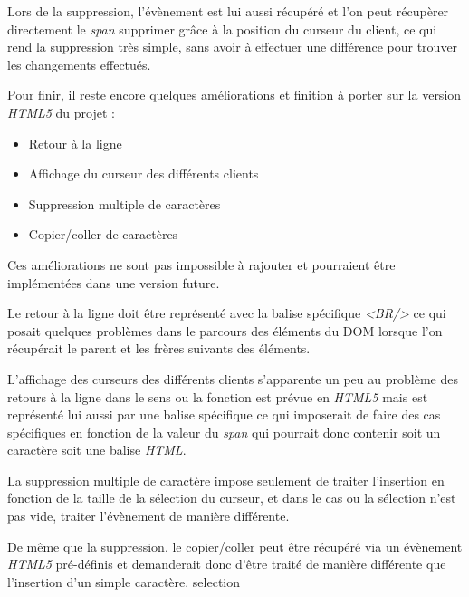 	Lors de la suppression, l'évènement est lui aussi récupéré et l'on peut 
	récupèrer directement le \emph{span} supprimer grâce à la position du curseur
	du client, ce qui rend la	suppression très simple, sans avoir à effectuer une
	différence pour trouver les changements effectués.
		
	Pour finir, il reste encore quelques améliorations et finition à porter sur 
	la version \emph{HTML5} du projet :
	\begin{itemize}
		\item Retour à la ligne
		\item Affichage du curseur des différents clients
		\item Suppression multiple de caractères
		\item Copier/coller de caractères
	\end{itemize}
	
	Ces améliorations ne sont pas impossible à rajouter et pourraient être 
	implémentées dans une version future.
	
	Le retour à la ligne doit être représenté avec la balise spécifique 
	\emph{<BR/>} ce qui posait quelques problèmes dans le parcours des éléments du
	DOM lorsque l'on récupérait le parent et les frères suivants des éléments.
	
	L'affichage des curseurs des différents clients s'apparente un peu au problème
	des retours à la ligne dans le sens ou la fonction est prévue en \emph{HTML5} 
	mais est représenté lui aussi par une balise spécifique ce qui imposerait de 
	faire des cas spécifiques en fonction de la valeur du \emph{span} qui 
	pourrait donc contenir soit un caractère soit une balise \emph{HTML}.
	
	La suppression multiple de caractère impose seulement de traiter 
	l'insertion en fonction de la taille de la sélection du curseur, et dans le 
	cas ou la sélection n'est pas vide, traiter l'évènement de manière différente.
	
	De même que la suppression, le copier/coller peut être récupéré via un 
	évènement \emph{HTML5} pré-définis et demanderait donc d'être traité de 
	manière différente que l'insertion d'un simple caractère.
	selection
